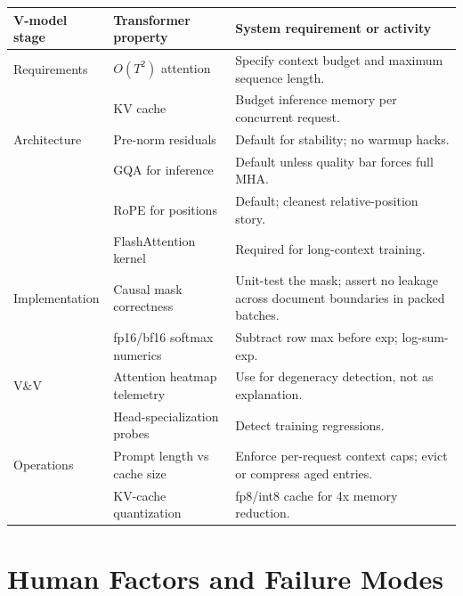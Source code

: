 \begin{center}
\begin{tabular}{|p{3.4cm}|p{3.4cm}|p{6.8cm}|}
\hline
V-model stage & Transformer property & System requirement or activity \\
\hline
Requirements & $O(T^2)$ attention
             & Specify context budget and maximum sequence length. \\
 & KV cache & Budget inference memory per concurrent request. \\
\hline
Architecture & Pre-norm residuals
             & Default for stability; no warmup hacks. \\
 & GQA for inference & Default unless quality bar forces full MHA. \\
 & RoPE for positions & Default; cleanest relative-position story. \\
 & FlashAttention kernel & Required for long-context training. \\
\hline
Implementation & Causal mask correctness
               & Unit-test the mask; assert no leakage across
                 document boundaries in packed batches. \\
 & fp16/bf16 softmax numerics
               & Subtract row max before exp; log-sum-exp. \\
\hline
V\&V & Attention heatmap telemetry
     & Use for degeneracy detection, not as explanation. \\
 & Head-specialization probes & Detect training regressions. \\
\hline
Operations & Prompt length vs cache size
           & Enforce per-request context caps; evict or
             compress aged entries. \\
 & KV-cache quantization & fp8/int8 cache for 4x memory reduction. \\
\hline
\end{tabular}
\end{center}

\section{Human Factors and Failure Modes}

